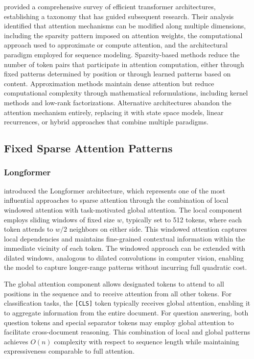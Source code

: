 \citet{tay2020efficient} provided a comprehensive survey of efficient transformer architectures, establishing a taxonomy that has guided subsequent research. Their analysis identified that attention mechanisms can be modified along multiple dimensions, including the sparsity pattern imposed on attention weights, the computational approach used to approximate or compute attention, and the architectural paradigm employed for sequence modeling. Sparsity-based methods reduce the number of token pairs that participate in attention computation, either through fixed patterns determined by position or through learned patterns based on content. Approximation methods maintain dense attention but reduce computational complexity through mathematical reformulations, including kernel methods and low-rank factorizations. Alternative architectures abandon the attention mechanism entirely, replacing it with state space models, linear recurrences, or hybrid approaches that combine multiple paradigms.

\subsection{Fixed Sparse Attention Patterns}

\subsubsection{Longformer}

\citet{beltagy2020longformer} introduced the Longformer architecture, which represents one of the most influential approaches to sparse attention through the combination of local windowed attention with task-motivated global attention. The local component employs sliding windows of fixed size $w$, typically set to 512 tokens, where each token attends to $w/2$ neighbors on either side. This windowed attention captures local dependencies and maintains fine-grained contextual information within the immediate vicinity of each token. The windowed approach can be extended with dilated windows, analogous to dilated convolutions in computer vision, enabling the model to capture longer-range patterns without incurring full quadratic cost.

The global attention component allows designated tokens to attend to all positions in the sequence and to receive attention from all other tokens. For classification tasks, the \texttt{[CLS]} token typically receives global attention, enabling it to aggregate information from the entire document. For question answering, both question tokens and special separator tokens may employ global attention to facilitate cross-document reasoning. This combination of local and global patterns achieves $O(n)$ complexity with respect to sequence length while maintaining expressiveness comparable to full attention.

